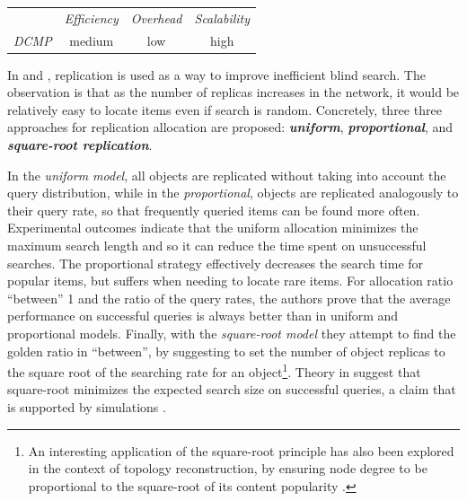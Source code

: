 %
\begin{center}
{\footnotesize
\begin{tabular}{rccc}
\multicolumn{1}{r}{} &
\multicolumn{1}{c}{\emph{Efficiency}} &
\multicolumn{1}{c}{\emph{Overhead}} &
\multicolumn{1}{c}{\emph{Scalability}}
\\
\cline{2-4}
\emph{DCMP} &
medium &
low &
high
\end{tabular}
}
\end{center}



In \cite{CS2002} and \cite{LCCLS2002}, replication is used as a way to improve
inefficient blind search. The observation is that as the number of replicas
increases in the network, it would be relatively easy to locate items even if
search is random. Concretely, three three approaches for replication allocation
are proposed: \textbf{\emph{uniform}}, \textbf{\emph{proportional}}, and
\textbf{\emph{square-root replication}}.

In the \emph{uniform model}, all objects are replicated without taking into account
the query distribution,
while in the \emph{proportional}, objects are replicated analogously to their query
rate, so that frequently queried items can be found more often. Experimental
outcomes indicate that the uniform allocation minimizes the maximum search
length and so it can reduce the time spent on unsuccessful searches. The
proportional strategy effectively decreases the search time for popular items,
but suffers when needing to locate rare items. For allocation ratio ``between''
1 and the ratio of the query rates, the authors
prove that the average performance on successful queries is always better
than in uniform and proportional models. Finally, with the
\emph{square-root model} they attempt to find the golden ratio in ``between'', by
suggesting to set the number of object
replicas to the square root of the searching rate for an object\footnote{An
interesting application of the square-root principle has also been explored
in the context of topology reconstruction, by ensuring node degree to be
proportional to the square-root of its content popularity \cite{C2005}.}.
Theory in \cite{CS2002} suggest that square-root minimizes the expected search size on
successful queries, a claim that is supported by simulations \cite{LCCLS2002}.  

